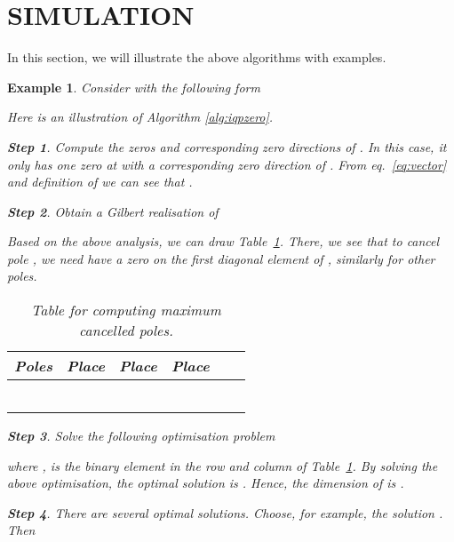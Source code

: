 \documentclass[twocolumn,12pt]{autart}
\theoremstyle{plain}
\newtheorem{example}{Example}
\newtheorem{Steps}{Step}
\begin{document}
\section{SIMULATION}
In this section, we will illustrate the above algorithms with examples.
\begin{example}
Consider  with the following form

Here is an illustration of Algorithm \ref{alg:iqpzero}.
\begin{Steps}
Compute the zeros and corresponding zero directions of . In this case, it only has one zero at  with a corresponding zero direction of . From eq.~\eqref{eq:vector} and definition of  we can see that .
\end{Steps}
\begin{Steps}
Obtain a Gilbert realisation of  

Based on the above analysis, we can draw Table~\ref{table:example1}. There, we see that to cancel pole , we need have 
a zero on the first diagonal element of , similarly for other poles.

\begin{table}[!]
 \centering
 \begin{tabular}{|c|c|c|c|c|c|}
   \hline
    Poles & Place & Place  & Place \\ \hline
    &  &  & \\ \hline
    &  &  &   \\ \hline
    &   &   &  \\ \hline
    & & & \\\hline
    &  &    &  \\ \hline
    &  &  &  \\\hline
  \end{tabular}
\caption{Table for computing maximum cancelled poles.}\label{table:example1}
\end{table}
\end{Steps}



\begin{Steps}
Solve the following optimisation problem

where ,  is the binary element in the  row and  column of Table~\ref{table:example1}. By solving the above optimisation, the optimal solution is .  Hence, the dimension of  is . 
\end{Steps}

\begin{Steps}
There are several optimal solutions. Choose, for example, the solution . Then 
 

\end{Steps}
\end{example}
\end{document}
